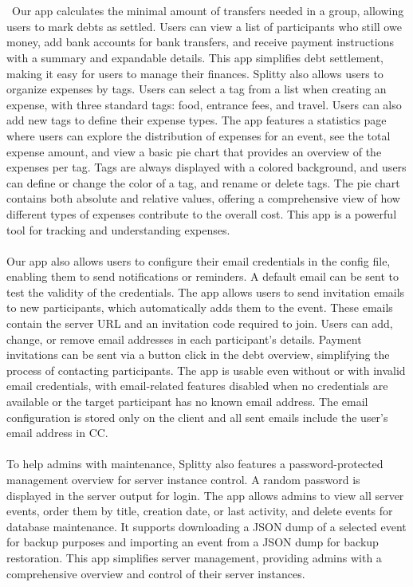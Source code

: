 \\\\\
Our app calculates the minimal amount of transfers needed in a group, allowing users to mark debts as settled. Users can view a list of participants who still owe money, add bank accounts for bank transfers, and receive payment instructions with a summary and expandable details. This app simplifies debt settlement, making it easy for users to manage their finances.
Splitty also allows users to organize expenses by tags. Users can select a tag from a list when creating an expense, with three standard tags: food, entrance fees, and travel. Users can also add new tags to define their expense types. The app features a statistics page where users can explore the distribution of expenses for an event, see the total expense amount, and view a basic pie chart that provides an overview of the expenses per tag. Tags are always displayed with a colored background, and users can define or change the color of a tag, and rename or delete tags. The pie chart contains both absolute and relative values, offering a comprehensive view of how different types of expenses contribute to the overall cost. This app is a powerful tool for tracking and understanding expenses.
\\\\
Our app also allows users to configure their email credentials in the config file, enabling them to send notifications or reminders. A default email can be sent to test the validity of the credentials. The app allows users to send invitation emails to new participants, which automatically adds them to the event. These emails contain the server URL and an invitation code required to join. Users can add, change, or remove email addresses in each participant’s details. Payment invitations can be sent via a button click in the debt overview, simplifying the process of contacting participants. The app is usable even without or with invalid email credentials, with email-related features disabled when no credentials are available or the target participant has no known email address. The email configuration is stored only on the client and all sent emails include the user’s email address in CC.
\\\\
To help admins with maintenance, Splitty also features a password-protected management overview for server instance control. A random password is displayed in the server output for login. The app allows admins to view all server events, order them by title, creation date, or last activity, and delete events for database maintenance. It supports downloading a JSON dump of a selected event for backup purposes and importing an event from a JSON dump for backup restoration. This app simplifies server management, providing admins with a comprehensive overview and control of their server instances.
